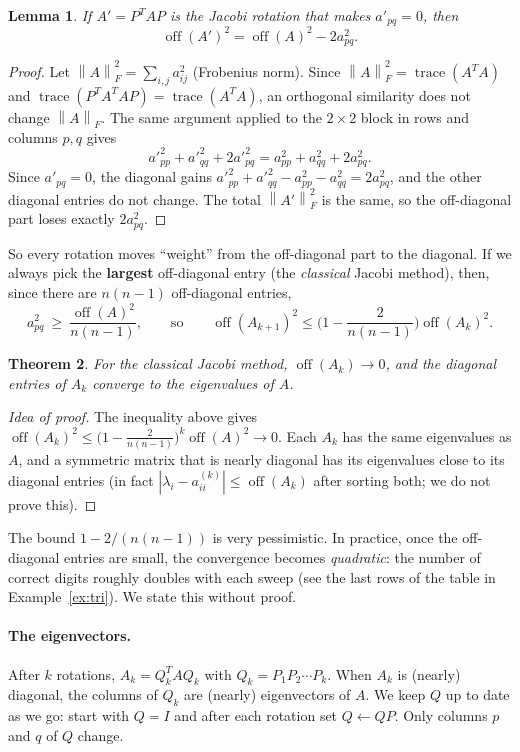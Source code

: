 \documentclass[11pt,a4paper]{article}
\newtheorem{theorem}{Theorem}
\newtheorem{lemma}[theorem]{Lemma}
\theoremstyle{definition}
\theoremstyle{remark}
\newcommand{\norm}[1]{\left\lVert #1\right\rVert}
\newcommand{\off}{\operatorname{off}}
\begin{document}
\begin{lemma}\label{lem:off}
If $A'=P^TAP$ is the Jacobi rotation that makes $a'_{pq}=0$, then
\[
\off(A')^2=\off(A)^2-2a_{pq}^2 .
\]
\end{lemma}
\begin{proof}
Let $\norm{A}_F^2=\sum_{i,j}a_{ij}^2$ (Frobenius norm). Since $\norm{A}_F^2=\operatorname{trace}(A^TA)$ and
$\operatorname{trace}(P^TA^TAP)=\operatorname{trace}(A^TA)$, an orthogonal similarity does not change $\norm{A}_F$.
The same argument applied to the $2\times2$ block in rows and columns $p,q$ gives
\[
a'^2_{pp}+a'^2_{qq}+2a'^2_{pq}=a_{pp}^2+a_{qq}^2+2a_{pq}^2 .
\]
Since $a'_{pq}=0$, the diagonal gains $a'^2_{pp}+a'^2_{qq}-a_{pp}^2-a_{qq}^2=2a_{pq}^2$, and the other diagonal entries do
not change. The total $\norm{A'}_F^2$ is the same, so the off-diagonal part loses exactly $2a_{pq}^2$.
\end{proof}

So every rotation moves ``weight'' from the off-diagonal part to the diagonal. If we always pick the
\textbf{largest} off-diagonal entry (the \emph{classical} Jacobi method), then, since there are $n(n-1)$ off-diagonal entries,
\[
a_{pq}^2\ \ge\ \frac{\off(A)^2}{n(n-1)} ,\qquad\text{so}\qquad
\off(A_{k+1})^2\le\Big(1-\frac{2}{n(n-1)}\Big)\off(A_k)^2 .
\]

\begin{theorem}
For the classical Jacobi method, $\off(A_k)\to0$, and the diagonal entries of $A_k$ converge to the eigenvalues of $A$.
\end{theorem}
\begin{proof}[Idea of proof]
The inequality above gives $\off(A_k)^2\le\big(1-\frac{2}{n(n-1)}\big)^k\off(A)^2\to0$. Each $A_k$ has the same eigenvalues as $A$,
and a symmetric matrix that is nearly diagonal has its eigenvalues close to its diagonal entries
(in fact $|\lambda_i-a^{(k)}_{ii}|\le\off(A_k)$ after sorting both; we do not prove this).
\end{proof}

The bound $1-2/(n(n-1))$ is very pessimistic. In practice, once the off-diagonal entries are small, the convergence
becomes \emph{quadratic}: the number of correct digits roughly doubles with each sweep (see the last rows of the table in
Example~\ref{ex:tri}). We state this without proof.

\paragraph{The eigenvectors.} After $k$ rotations, $A_k=Q_k^TAQ_k$ with $Q_k=P_1P_2\cdots P_k$. When $A_k$ is
(nearly) diagonal, the columns of $Q_k$ are (nearly) eigenvectors of $A$. We keep $Q$ up to date as we go:
start with $Q=I$ and after each rotation set $Q\gets QP$. Only columns $p$ and $q$ of $Q$ change.
\end{document}
